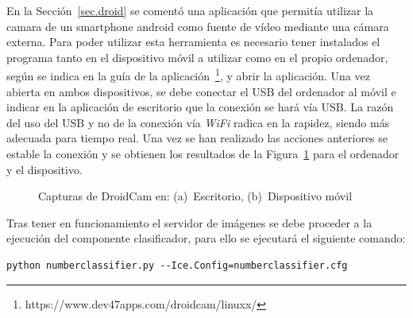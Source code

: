 En la Sección~\ref{sec.droid} se comentó una aplicación que permitía utilizar la camara de un smartphone android como fuente de vídeo mediante una cámara externa. Para poder utilizar esta herramienta es necesario tener instalados el programa tanto en el dispositivo móvil a utilizar como en el propio ordenador, según se indica en la guía de la aplicación~\footnote{https://www.dev47apps.com/droidcam/linuxx/}, y abrir la aplicación. Una vez abierta en ambos dispositivos, se debe conectar el USB del ordenador al móvil e indicar en la aplicación de escritorio que la conexión se hará vía USB. La razón del uso del USB y no de la conexión vía \textit{WiFi} radica en la rapidez, siendo más adecuada para tiempo real. Una vez se han realizado las acciones anteriores se estable la conexión y se obtienen los resultados de la Figura~\ref{fig.droid} para el ordenador y el dispositivo.\\
\vspace{20cm}
\begin{figure}[H]
	\centering
	 \hspace{10pt}
	\caption{Capturas de DroidCam en: (a)~Escritorio, (b)~Dispositivo móvil}
	\label{fig.droid}
\end{figure}

Tras tener en funcionamiento el servidor de imágenes se debe proceder a la ejecución del componente clasificador, para ello se ejecutará el siguiente comando:
\vspace{10pt}
\begin{lstlisting}[frame=single]
	python numberclassifier.py --Ice.Config=numberclassifier.cfg
\end{lstlisting}

